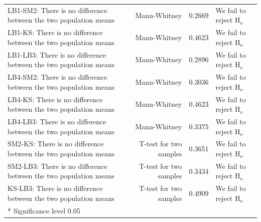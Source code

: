 \begin{table}[H]
{\begin{tabular}{>{\RaggedRight}p{5.5cm}rr>{\RaggedRight}p{3.5cm}}
LB1-SM2: There is no difference between the two population means & Mann-Whitney & 0.2669 & We fail to reject $\text{H}_o$ \\
LB1-KS: There is no difference between the two population means & Mann-Whitney & 0.4623 & We fail to reject $\text{H}_o$ \\
LB1-LB3: There is no difference between the two population means & Mann-Whitney & 0.2896 & We fail to reject $\text{H}_o$ \\
LB4-SM2: There is no difference between the two population means & Mann-Whitney & 0.3036 & We fail to reject $\text{H}_o$ \\
LB4-KS: There is no difference between the two population means & Mann-Whitney & 0.4623 & We fail to reject $\text{H}_o$ \\
LB4-LB3: There is no difference between the two population means & Mann-Whitney & 0.3375 & We fail to reject $\text{H}_o$ \\
SM2-KS: There is no difference between the two population means & T-test for two samples & 0.3651 & We fail to reject $\text{H}_o$ \\
SM2-LB3: There is no difference between the two population means & T-test for two samples & 0.3434 & We fail to reject $\text{H}_o$ \\
KS-LB3: There is no difference between the two population means & T-test for two samples & 0.4909 & We fail to reject $\text{H}_o$ \\
\bottomrule
*  Significance level 0.05
\end{tabular}
}
\end{table}

